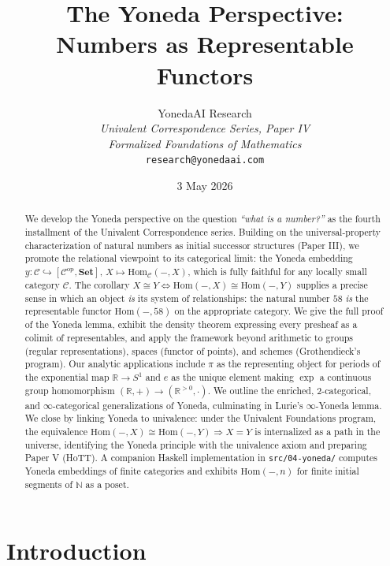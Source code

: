 \documentclass[12pt]{article}
\title{The Yoneda Perspective: \\
Numbers as Representable Functors}
\author{YonedaAI Research \\
\textit{Univalent Correspondence Series, Paper IV} \\
\textit{Formalized Foundations of Mathematics} \\
\texttt{research@yonedaai.com} }
\date{3 May 2026}
\theoremstyle{definition}
\theoremstyle{remark}
\begin{document}
\maketitle

\begin{abstract}
We develop the Yoneda perspective on the question \emph{``what is a number?''} as the fourth installment of the Univalent Correspondence series. Building on the universal-property characterization of natural numbers as initial successor structures (Paper III), we promote the relational viewpoint to its categorical limit: the Yoneda embedding $y\colon \mathcal{C} \hookrightarrow [\mathcal{C}^{\mathrm{op}}, \mathbf{Set}]$, $X \mapsto \mathrm{Hom}_{\mathcal{C}}(-, X)$, which is fully faithful for any locally small category $\mathcal{C}$. The corollary $X \cong Y \iff \mathrm{Hom}(-, X) \cong \mathrm{Hom}(-, Y)$ supplies a precise sense in which an object \emph{is} its system of relationships: the natural number $58$ \emph{is} the representable functor $\mathrm{Hom}(-, 58)$ on the appropriate category. We give the full proof of the Yoneda lemma, exhibit the density theorem expressing every presheaf as a colimit of representables, and apply the framework beyond arithmetic to groups (regular representations), spaces (functor of points), and schemes (Grothendieck's program). Our analytic applications include $\pi$ as the representing object for periods of the exponential map $\mathbb{R} \to S^{1}$ and $e$ as the unique element making $\exp$ a continuous group homomorphism $(\mathbb{R}, +) \to (\mathbb{R}^{>0}, \cdot)$. We outline the enriched, $2$-categorical, and $\infty$-categorical generalizations of Yoneda, culminating in Lurie's $\infty$-Yoneda lemma. We close by linking Yoneda to univalence: under the Univalent Foundations program, the equivalence $\mathrm{Hom}(-, X) \cong \mathrm{Hom}(-, Y) \Rightarrow X = Y$ is internalized as a path in the universe, identifying the Yoneda principle with the univalence axiom and preparing Paper V (HoTT). A companion Haskell implementation in \texttt{src/04-yoneda/} computes Yoneda embeddings of finite categories and exhibits $\mathrm{Hom}(-, n)$ for finite initial segments of $\mathbb{N}$ as a poset.
\end{abstract}

\tableofcontents

\section{Introduction}
\label{sec:intro}
\end{document}

